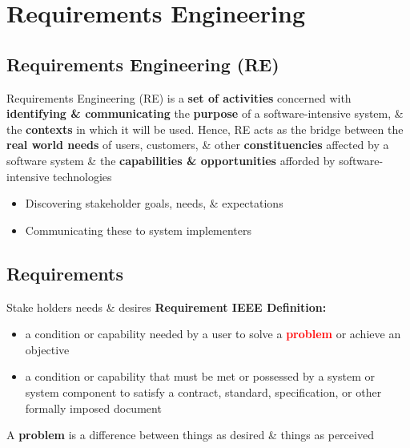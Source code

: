 \documentclass{report}
\newcommand{\textr}[1]{\textcolor{red}{#1}}
\newcommand{\textbfr}[1]{\textbf{\textr{#1}}}
\begin{document}
\newpage
\chapter{Requirements Engineering}
\section{Requirements Engineering (RE)}
\noindent Requirements Engineering (RE) is a \textbf{set of activities} concerned with \textbf{identifying \& communicating} the \textbf{purpose} of a software-intensive system, \& the \textbf{contexts} in which it will be used. Hence, RE acts as the bridge between the \textbf{real world needs} of users, customers, \& other \textbf{constituencies} affected by a software system \& the \textbf{capabilities \& opportunities} afforded by software-intensive technologies
\begin{itemize}
  \item Discovering stakeholder goals, needs, \& expectations
  \item Communicating these to system implementers
\end{itemize}

\section{Requirements}
\noindent Stake holders needs \& desires\newline
\textbf{Requirement IEEE Definition:}
  \begin{itemize}
    \item a condition or capability needed by a user to solve a \textbfr{problem} or achieve an objective
    \item a condition or capability that must be met or possessed by a system or system component to satisfy a contract, standard, specification, or other formally imposed document
  \end{itemize}
A \textbf{problem} is a difference between things as desired \& things as perceived
\end{document}
